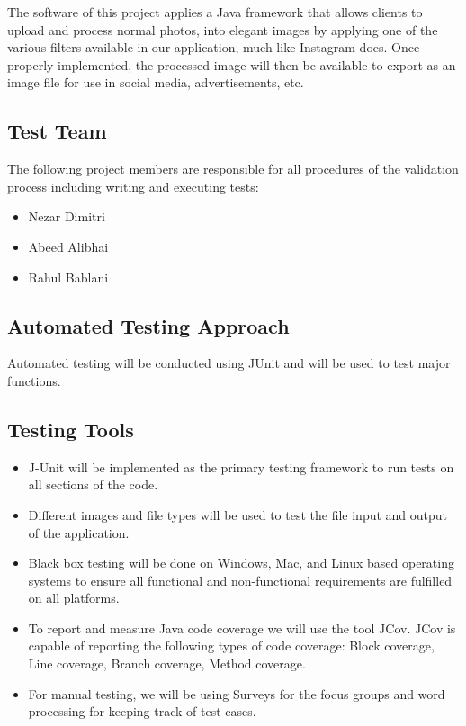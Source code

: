 \documentclass[12pt, titlepage]{article}
\begin{document}
The software of this project applies a Java framework that allows clients to upload and process normal photos, into elegant images by applying one of the various filters available in our application, much like Instagram does. Once properly implemented, the processed image will then be available to export as an image file for use in social media, advertisements, etc.

\subsection{Test Team}

The following project members are responsible for all procedures of the validation
process including writing and executing tests:

\begin{itemize}
\item{Nezar Dimitri}
\item{Abeed Alibhai}
\item{Rahul Bablani}
\end{itemize}

\subsection{Automated Testing Approach}

Automated testing will be conducted using JUnit and will be used to test major functions.

\subsection{Testing Tools}
\begin{itemize}
\item J-Unit will be implemented as the primary testing framework to run tests on all sections of the code.
\item Different images and file types will be used to test the file input and output of the application.
\item Black box testing will be done on Windows, Mac, and Linux based operating systems to ensure all functional and non-functional requirements are fulfilled on all platforms.
\item To report and measure Java code coverage we will use the tool JCov. JCov is capable of reporting the following types of code coverage: Block coverage, Line coverage, Branch coverage, Method coverage.
\item For manual testing, we will be using Surveys for the focus
groups and word processing for keeping track of test cases.
\end{itemize}
\end{document}
